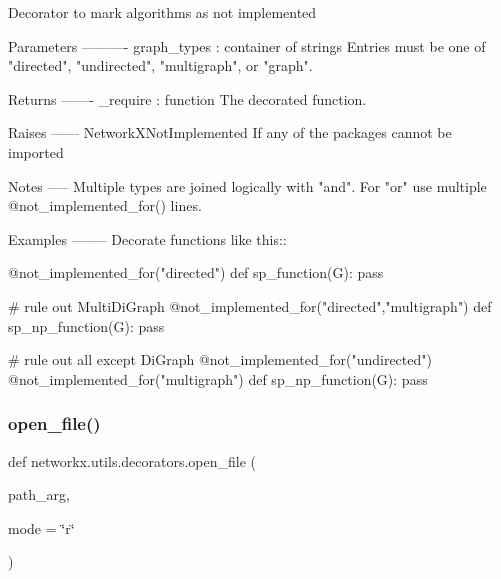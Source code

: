 \begin{DoxyVerb}Decorator to mark algorithms as not implemented

Parameters
----------
graph_types : container of strings
    Entries must be one of "directed", "undirected", "multigraph", or "graph".

Returns
-------
_require : function
    The decorated function.

Raises
------
NetworkXNotImplemented
If any of the packages cannot be imported

Notes
-----
Multiple types are joined logically with "and".
For "or" use multiple @not_implemented_for() lines.

Examples
--------
Decorate functions like this::

   @not_implemented_for("directed")
   def sp_function(G):
       pass

   # rule out MultiDiGraph
   @not_implemented_for("directed","multigraph")
   def sp_np_function(G):
       pass

   # rule out all except DiGraph
   @not_implemented_for("undirected")
   @not_implemented_for("multigraph")
   def sp_np_function(G):
       pass
\end{DoxyVerb}
 \mbox{\label{namespacenetworkx_1_1utils_1_1decorators_a18d22de0af3b4116edf4d1b4c6facfed}} 
\subsubsection{\texorpdfstring{open\+\_\+file()}{open\_file()}}
{\footnotesize\ttfamily def networkx.\+utils.\+decorators.\+open\+\_\+file (\begin{DoxyParamCaption}\item[{}]{path\+\_\+arg,  }\item[{}]{mode = {\ttfamily \char`\"{}r\char`\"{}} }\end{DoxyParamCaption})}

